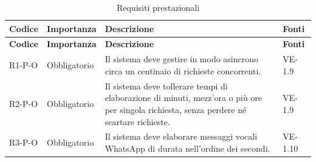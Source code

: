{
    \small
    \renewcommand{\arraystretch}{1.3}
    \begin{longtable}{|>{\raggedright\arraybackslash}p{1.8cm}|>{\raggedright\arraybackslash}p{2.3cm}|>{\raggedright\arraybackslash}p{6.6cm}|>{\raggedright\arraybackslash}p{3.1cm}|}
    \caption{Requisiti prestazionali}\label{tab:req-prestazionali}\\
    \hline
    \rowcolor[gray]{0.88} \textbf{Codice} & \textbf{Importanza} & \textbf{Descrizione} & \textbf{Fonti} \\ \hline
    \endfirsthead
    \hline
    \rowcolor[gray]{0.88} \textbf{Codice} & \textbf{Importanza} & \textbf{Descrizione} & \textbf{Fonti} \\ \hline
    \endhead
    \mbox{R1-P-O} & Obbligatorio & Il sistema deve gestire in modo asincrono circa un centinaio di richieste concorrenti. & \mbox{VE-1.9} \\ \hline
    \mbox{R2-P-O} & Obbligatorio & Il sistema deve tollerare tempi di elaborazione di minuti, mezz'ora o più ore per singola richiesta, senza perdere né scartare richieste. & \mbox{VE-1.9} \\ \hline
    \mbox{R3-P-O} & Obbligatorio & Il sistema deve elaborare messaggi vocali WhatsApp di durata nell'ordine dei secondi. & \mbox{VE-1.10} \\ \hline
    \end{longtable}
}